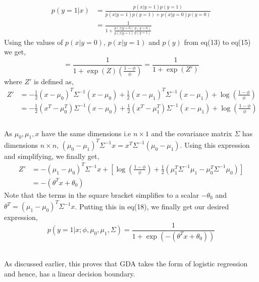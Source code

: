 \documentclass[12pt]{article}
\begin{document}
\begin{flushleft}
\begin{equation}
\begin{aligned}
p(y=1|x)&=\frac{p(x|y=1)p(y=1)}{p(x|y=1)p(y=1)+p(x|y=0)p(y=0)}\\
       &=\frac{1}{1+\frac{p(x|y=0)}{p(x|y=1)}\frac{p(y=0)}{p(y=1)}}
\end{aligned}
\end{equation}
Using the values of $p(x|y=0)$, $p(x|y=1)$ and $p(y)$ from eq(13) to eq(15) we get,
\begin{equation}
    =\frac{1}{1+\exp{(Z)}(\frac{1-\phi}{\phi})}=\frac{1}{1+\exp{(Z')}}
\end{equation}
where $Z'$ is defined as, 
\begin{equation}
\begin{aligned}
    Z'&=-\frac{1}{2}(x-\mu_0)^T \Sigma^{-1}(x-\mu_0)+\frac{1}{2}(x-\mu_1)^T \Sigma^{-1}(x-\mu_1)+\log(\frac{1-\phi}{\phi})\\
    &=-\frac{1}{2}(x^T-\mu_0^T) \Sigma^{-1}(x-\mu_0)+\frac{1}{2}(x^T-\mu_1^T) \Sigma^{-1}(x-\mu_1)+\log(\frac{1-\phi}{\phi})\\
\end{aligned}
\end{equation}\\
\vspace{6mm}
As $\mu_0, \mu_1, x$ have the same dimensions i.e $n \times 1$ and the covariance matrix $\Sigma$ has dimensions $n\times n$, $(\mu_0-\mu_1)^T\Sigma^{-1}x=x^T\Sigma^{-1}(\mu_0-\mu_1)$. Using this expression and simplifying, we finally get,
\begin{equation}
\begin{aligned}
Z'&=-(\mu_1-\mu_0)^T\Sigma^{-1}x+[\log(\frac{1-\phi}{\phi})+\frac{1}{2}(\mu_1^T\Sigma^{-1}\mu_1-\mu_0^T\Sigma^{-1}\mu_0)]\\
&=-(\theta^Tx+\theta_0)
\end{aligned}
\end{equation}
Note that the terms in the square bracket simplifies to a scalar $-\theta_0$ and $\theta^T=(\mu_1-\mu_0)^T\Sigma^{-1}x$. Putting this in eq(18), we finally get our desired expression,
\begin{equation}
    p(y=1|x;\phi,\mu_0,\mu_1,\Sigma)=\frac{1}{1+\exp{(-(\theta^Tx+\theta_0))}}
\end{equation}\\
\vspace{8mm}
\end{flushleft}
As discussed earlier, this proves that GDA takes the form of logistic regression and hence, has a linear decision boundary.
\end{document}
